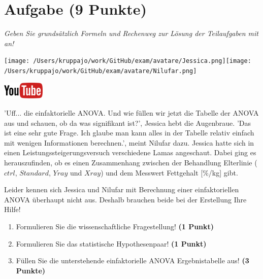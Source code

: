\documentclass[a4paper, 9pt]{scrartcl}\usepackage[]{graphicx}\usepackage[]{xcolor}
\begin{document}
\clearpage

\section{Aufgabe \hfill (9 Punkte)}

\textit{Geben Sie grundsätzlich Formeln und Rechenweg zur Lösung der Teilaufgaben mit an!} \\[1Ex]
 

 
\begin{minipage}[t]{0.5\textwidth}
\texttt{[image: /Users/kruppajo/work/GitHub/exam/avatare/Jessica.png]}\hspace{-4mm}\texttt{[image: /Users/kruppajo/work/GitHub/exam/avatare/Nilufar.png]}
\end{minipage}
\begin{minipage}[t]{0.5\textwidth}
\hfill
\href{https://youtu.be/IhecxMcCENY}{\includegraphics[width = 2cm]{img/youtube}}
\end{minipage}
\vspace{1ex}



'Uff... die einfaktorielle ANOVA. Und wie füllen wir jetzt die Tabelle der ANOVA aus und schauen, ob da was signifikant ist?', Jessica hebt die Augenbraue. 'Das ist eine sehr gute Frage. Ich glaube man kann alles in der Tabelle relativ einfach mit wenigen Informationen berechnen.', meint Nilufar dazu. Jessica hatte sich in einen Leistungssteigerungsversuch verschiedene Lamas angeschaut. Dabei ging es herauszufinden, ob es einen Zusammenhang zwischen der Behandlung Elterlinie ($ctrl$, $Standard$, $Yray$ und $Xray$) und dem Messwert Fettgehalt [\%/kg] gibt.



\vspace{1ex}

Leider kennen sich Jessica und Nilufar mit Berechnung einer einfaktoriellen ANOVA überhaupt nicht aus. Deshalb brauchen beide bei der Erstellung Ihre Hilfe! 

\begin{enumerate}
  \item Formulieren Sie die wissenschaftliche Fragestellung! \textbf{(1 Punkt)}
  \item Formulieren Sie das statistische Hypothesenpaar! \textbf{(1 Punkt)}
\item Füllen Sie die unterstehende einfaktorielle ANOVA Ergebnistabelle aus! \textbf{(3 Punkte)}
\end{enumerate}
\end{document}

